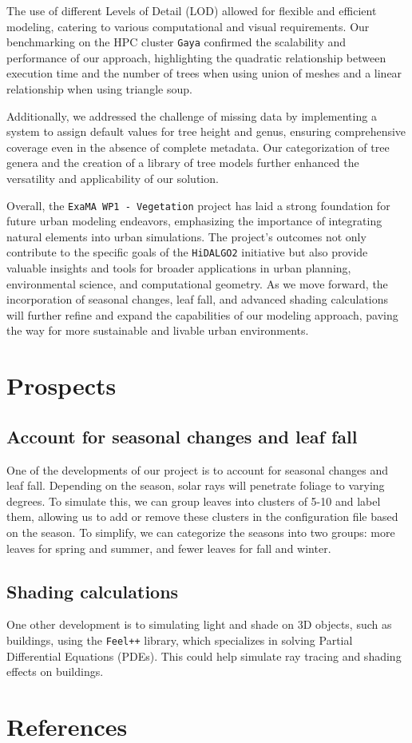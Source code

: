 \documentclass[12pt]{article}
\begin{document}
The use of different Levels of Detail (LOD) allowed for flexible and efficient 
modeling, catering to various computational and visual requirements. Our 
benchmarking on the HPC cluster \texttt{Gaya} confirmed the scalability and performance 
of our approach, highlighting the quadratic relationship between execution time 
and the number of trees when using union of meshes and a linear relationship 
when using triangle soup.

Additionally, we addressed the challenge of missing data by implementing a 
system to assign default values for tree height and genus, ensuring comprehensive 
coverage even in the absence of complete metadata. Our categorization of tree 
genera and the creation of a library of tree models further enhanced the 
versatility and applicability of our solution.

Overall, the \texttt{ExaMA WP1 - Vegetation} project has laid a strong foundation for 
future urban modeling endeavors, emphasizing the importance of integrating 
natural elements into urban simulations. The project's outcomes not only 
contribute to the specific goals of the \texttt{HiDALGO2} initiative but also provide 
valuable insights and tools for broader applications in urban planning, 
environmental science, and computational geometry. As we move forward, the 
incorporation of seasonal changes, leaf fall, and advanced shading calculations 
will further refine and expand the capabilities of our modeling approach, paving 
the way for more sustainable and livable urban environments.

\newpage

\section{Prospects}

\subsection{Account for seasonal changes and leaf fall}
One of the developments of our project is to account for seasonal changes and
leaf fall. Depending on the season, solar rays will penetrate foliage to
varying degrees. To simulate this, we can group leaves into clusters of 5-10
and label them, allowing us to add or remove these clusters in the
configuration file based on the season. To simplify, we can categorize the
seasons into two groups: more leaves for spring and summer, and fewer leaves
for fall and winter.

\subsection{Shading calculations}
One other development is to simulating light and shade on 3D objects, such as
buildings, using the \texttt{Feel++}\cite{feel++} library, which specializes in
solving Partial Differential Equations (PDEs). This could help simulate ray
tracing and shading effects on buildings.

\newpage

\section{References}


\end{document}
